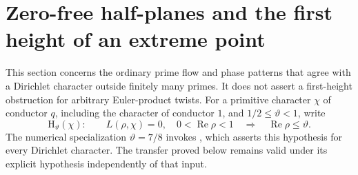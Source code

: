 \documentclass[11pt,letterpaper]{article}
\theoremstyle{definition}
\theoremstyle{remark}
\renewcommand{\Re}{\operatorname{Re}}
\newcommand{\1}{\mathbf 1}
\begin{document}
\section{Zero-free half-planes and the first height of an extreme point}
\label{p03:sec:zero-free-transfer}

This section concerns the ordinary prime flow and phase patterns that
agree with a Dirichlet character outside finitely many primes. It does
not assert a first-height obstruction for arbitrary Euler-product twists.
For a primitive character $\chi$ of conductor $q$, including the
character of conductor $1$, and $1/2\le\vartheta<1$, write
\begin{equation}\label{p03:eq:H-theta}
 \mathrm H_\vartheta(\chi):\qquad
 L(\rho,\chi)=0,\quad 0<\Re\rho<1
 \quad\Longrightarrow\quad \Re\rho\le\vartheta.
\end{equation}
The numerical specialization $\vartheta=7/8$ invokes
\cite[Theorem~1.1]{OpenAIQuasiRH}, which asserts this hypothesis for
every Dirichlet character. The transfer proved below remains valid
under its explicit hypothesis independently of that input.
\end{document}
